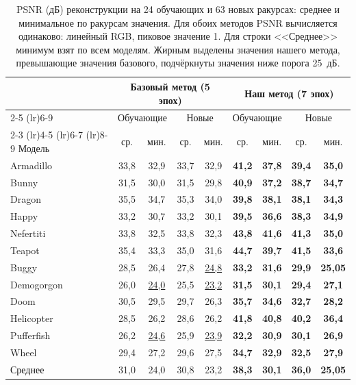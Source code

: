 \begin{table}[ht]
    \centering
    \small
    \setlength{\tabcolsep}{4pt}
    \caption{PSNR (дБ) реконструкции на 24 обучающих и 63 новых ракурсах: среднее и минимальное по ракурсам значения. Для обоих методов PSNR вычисляется одинаково: линейный RGB, пиковое значение 1. Для строки <<Среднее>> минимум взят по всем моделям. Жирным выделены значения нашего метода, превышающие значения базового, подчёркнуты значения ниже порога 25~дБ.}
    \label{tab:psnr12}
    \begin{tabular}{lcccccccc}
        \toprule
        & \multicolumn{4}{c}{Базовый метод (5 эпох)} & \multicolumn{4}{c}{Наш метод (7 эпох)} \\
        \cmidrule(lr){2-5} \cmidrule(lr){6-9}
        & \multicolumn{2}{c}{Обучающие} & \multicolumn{2}{c}{Новые} & \multicolumn{2}{c}{Обучающие} & \multicolumn{2}{c}{Новые} \\
        \cmidrule(lr){2-3} \cmidrule(lr){4-5} \cmidrule(lr){6-7} \cmidrule(lr){8-9}
        Модель & ср. & мин. & ср. & мин. & ср. & мин. & ср. & мин. \\
        \midrule
        Armadillo & 33,8 & 32,9 & 33,7 & 32,9 & \textbf{41,2} & \textbf{37,8} & \textbf{39,4} & \textbf{35,0} \\
        Bunny & 31,5 & 30,0 & 31,5 & 29,8 & \textbf{40,9} & \textbf{37,2} & \textbf{38,7} & \textbf{34,7} \\
        Dragon & 35,5 & 34,7 & 35,3 & 34,0 & \textbf{39,8} & \textbf{38,1} & \textbf{38,1} & \textbf{34,3} \\
        Happy & 33,2 & 30,7 & 33,2 & 30,1 & \textbf{39,5} & \textbf{36,6} & \textbf{38,3} & \textbf{34,9} \\
        Nefertiti & 33,8 & 32,5 & 33,8 & 32,3 & \textbf{43,8} & \textbf{41,6} & \textbf{41,3} & \textbf{35,0} \\
        Teapot & 35,4 & 33,3 & 35,0 & 31,6 & \textbf{44,7} & \textbf{39,7} & \textbf{41,5} & \textbf{33,6} \\
        Buggy & 28,5 & 26,4 & 27,8 & \underline{24,8} & \textbf{33,2} & \textbf{31,6} & \textbf{29,9} & \textbf{25,05} \\
        Demogorgon & 26,0 & \underline{24,0} & 25,5 & \underline{23,2} & \textbf{31,5} & \textbf{30,1} & \textbf{29,4} & \textbf{27,1} \\
        Doom & 30,5 & 29,5 & 29,7 & 26,3 & \textbf{35,7} & \textbf{34,6} & \textbf{32,7} & \textbf{28,2} \\
        Helicopter & 28,5 & 26,2 & 28,6 & 26,2 & \textbf{41,8} & \textbf{40,8} & \textbf{40,2} & \textbf{36,4} \\
        Pufferfish & 26,2 & \underline{24,6} & 25,9 & \underline{23,9} & \textbf{32,2} & \textbf{30,9} & \textbf{30,1} & \textbf{26,9} \\
        Wheel & 29,4 & 27,2 & 29,6 & 27,5 & \textbf{34,7} & \textbf{32,9} & \textbf{32,5} & \textbf{27,9} \\
        \midrule
        Среднее & 31,0 & 24,0 & 30,8 & 23,2 & \textbf{38,3} & \textbf{30,1} & \textbf{36,0} & \textbf{25,05} \\
        \bottomrule
    \end{tabular}
\end{table}

